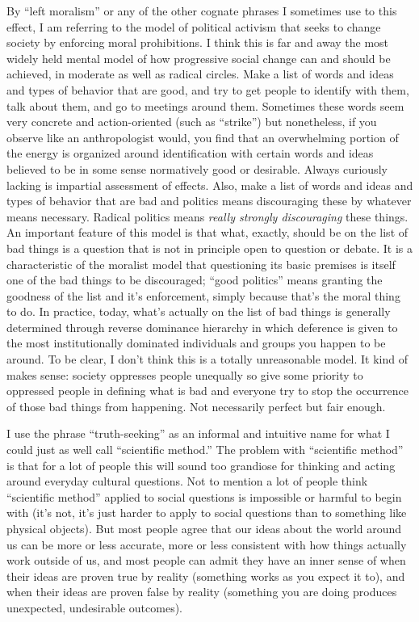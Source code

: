 \documentclass[a4paper,12pt,margin=.5in]{article}
\begin{document}
By ``left moralism'' or any of the other cognate phrases I sometimes use
to this effect, I am referring to the model of political activism that
seeks to change society by enforcing moral prohibitions. I think this is
far and away the most widely held mental model of how progressive social
change can and should be achieved, in moderate as well as radical
circles. Make a list of words and ideas and types of behavior that are
good, and try to get people to identify with them, talk about them, and
go to meetings around them. Sometimes these words seem very concrete and
action-oriented (such as ``strike'') but nonetheless, if you observe
like an anthropologist would, you find that an overwhelming portion of
the energy is organized around identification with certain words and
ideas believed to be in some sense normatively good or desirable. Always
curiously lacking is impartial assessment of effects. Also, make a list
of words and ideas and types of behavior that are bad and politics means
discouraging these by whatever means necessary. Radical politics means
\emph{really strongly discouraging} these things. An important feature
of this model is that what, exactly, should be on the list of bad things
is a question that is not in principle open to question or debate. It is
a characteristic of the moralist model that questioning its basic
premises is itself one of the bad things to be discouraged; ``good
politics'' means granting the goodness of the list and it's enforcement,
simply because that's the moral thing to do. In practice, today, what's
actually on the list of bad things is generally determined through
reverse dominance hierarchy in which deference is given to the most
institutionally dominated individuals and groups you happen to be
around. To be clear, I don't think this is a totally unreasonable model.
It kind of makes sense: society oppresses people unequally so give some
priority to oppressed people in defining what is bad and everyone try to
stop the occurrence of those bad things from happening. Not necessarily
perfect but fair enough.

I use the phrase ``truth-seeking'' as an informal and intuitive name for
what I could just as well call ``scientific method.'' The problem with
``scientific method'' is that for a lot of people this will sound too
grandiose for thinking and acting around everyday cultural questions.
Not to mention a lot of people think ``scientific method'' applied to
social questions is impossible or harmful to begin with (it's not, it's
just harder to apply to social questions than to something like physical
objects). But most people agree that our ideas about the world around us
can be more or less accurate, more or less consistent with how things
actually work outside of us, and most people can admit they have an
inner sense of when their ideas are proven true by reality (something
works as you expect it to), and when their ideas are proven false by
reality (something you are doing produces unexpected, undesirable
outcomes).
\end{document}
